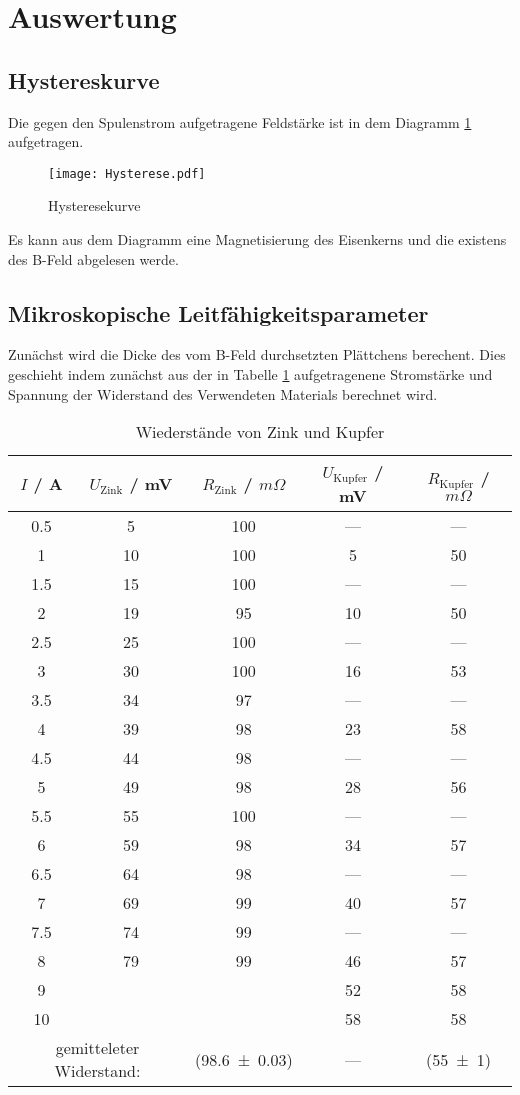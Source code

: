 \section{Auswertung}
\label{sec:Auswertung}
\subsection{Hystereskurve}
Die gegen den Spulenstrom aufgetragene Feldstärke ist in dem Diagramm \ref{fig:Hyst} aufgetragen.
\begin{figure}
  \centering
  \texttt{[image: Hysterese.pdf]}
  \caption{Hysteresekurve}
  \label{fig:Hyst}
\end{figure}
Es kann aus dem Diagramm eine Magnetisierung des Eisenkerns und die existens des B-Feld abgelesen werde.

\subsection{Mikroskopische Leitfähigkeitsparameter}
Zunächst wird die Dicke des vom B-Feld durchsetzten Plättchens berechent. Dies geschieht indem zunächst aus der in Tabelle \ref{tab:RZK} aufgetragenene Stromstärke und Spannung der Widerstand des Verwendeten Materials berechnet wird.
\begin{table}
  \centering
  \begin{tabular}{c|c c|c c}
    \toprule
    $I$ / A & $U_\text{Zink}$ / mV & $R_\text{Zink}$ / $m\Omega$ & $U_\text{Kupfer}$ / mV & $R_\text{Kupfer}$ / $m\Omega$ \\
    \midrule
	0.5	& 5	& 100	& ---	& ---	\\
	1	& 10	& 100	& 5	& 50	\\
	1.5	& 15	& 100	& ---	& ---	\\
	2	& 19	& 95	& 10	& 50	\\
	2.5	& 25	& 100	& ---	& ---	\\
	3	& 30	& 100	& 16 	& 53	\\
	3.5	& 34	& 97	& ---	& ---	\\
	4	& 39	& 98	& 23	& 58	\\
	4.5	& 44	& 98	& ---	& ---	\\
	5	& 49	& 98	& 28	& 56	\\
	5.5	& 55	& 100	& ---	& ---	\\
	6	& 59	& 98	& 34	& 57	\\
	6.5	& 64	& 98	& ---	& ---	\\
	7	& 69	& 99	& 40  	& 57	\\
	7.5	& 74	& 99	& ---	& ---	\\
	8	& 79	& 99	& 46	& 57	\\
	9	&	&	& 52	& 58	\\
	10	&	&	& 58	& 58	\\
    \midrule
    \multicolumn{2}{c}{gemitteleter Widerstand:}& (\num{98.6 +- 0.03}) & --- & (\num{55 +- 1}) \\
    \bottomrule
  \end{tabular}
  \caption{Wiederstände von Zink und Kupfer}
  \label{tab:RZK}
\end{table}
